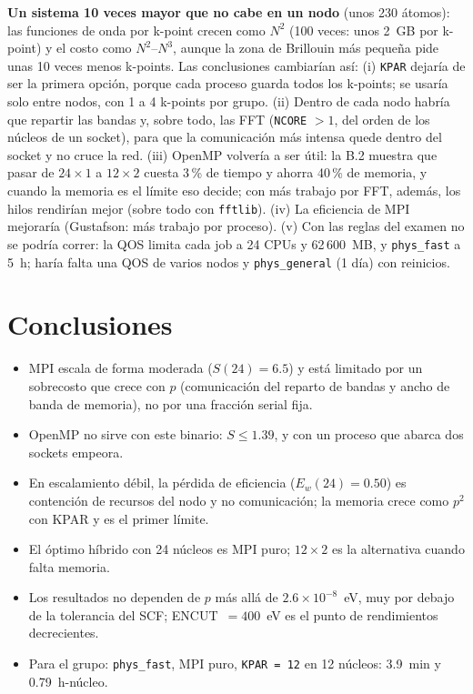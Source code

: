 \documentclass[11pt,a4paper]{article}
\newcommand{\cod}[1]{\texttt{#1}}
\begin{document}
\textbf{Un sistema 10 veces mayor que no cabe en un nodo} (unos 230 átomos): las funciones de onda por
k-point crecen como $N^2$ (100 veces: unos 2~GB por k-point) y el costo como $N^2$--$N^3$, aunque la zona de
Brillouin más pequeña pide unas 10 veces menos k-points. Las conclusiones cambiarían así:
(i) \cod{KPAR} dejaría de ser la primera opción, porque cada proceso guarda todos los k-points; se usaría
solo entre nodos, con 1 a 4 k-points por grupo. (ii) Dentro de cada nodo habría que repartir las bandas y,
sobre todo, las FFT (\cod{NCORE} $>1$, del orden de los núcleos de un socket), para que la comunicación más
intensa quede dentro del socket y no cruce la red. (iii) OpenMP volvería a ser útil: la B.2 muestra que pasar de
$24\times1$ a $12\times2$ cuesta 3\,\% de tiempo y ahorra 40\,\% de memoria, y cuando la memoria es el límite
eso decide; con más trabajo por FFT, además, los hilos rendirían mejor (sobre todo con \cod{fftlib}).
(iv) La eficiencia de MPI mejoraría (Gustafson: más trabajo por proceso). (v) Con las reglas del examen no se
podría correr: la QOS limita cada job a 24 CPUs y 62\,600~MB, y \cod{phys\_fast} a 5~h; haría falta una QOS
de varios nodos y \cod{phys\_general} (1 día) con reinicios.

\section{Conclusiones}
\begin{itemize}[leftmargin=*]
\item MPI escala de forma moderada ($S(24)=6.5$) y está limitado por un sobrecosto que crece con $p$
(comunicación del reparto de bandas y ancho de banda de memoria), no por una fracción serial fija.
\item OpenMP no sirve con este binario: $S\le1.39$, y con un proceso que abarca dos sockets empeora.
\item En escalamiento débil, la pérdida de eficiencia ($E_w(24)=0.50$) es contención de recursos del nodo y no
comunicación; la memoria crece como $p^2$ con KPAR y es el primer límite.
\item El óptimo híbrido con 24 núcleos es MPI puro; $12\times2$ es la alternativa cuando falta memoria.
\item Los resultados no dependen de $p$ más allá de $2.6\times10^{-8}$~eV, muy por debajo de la tolerancia
del SCF; ENCUT~$=400$~eV es el punto de rendimientos decrecientes.
\item Para el grupo: \cod{phys\_fast}, MPI puro, \cod{KPAR = 12} en 12 núcleos: 3.9~min y 0.79~h-núcleo.
\end{itemize}
\end{document}
